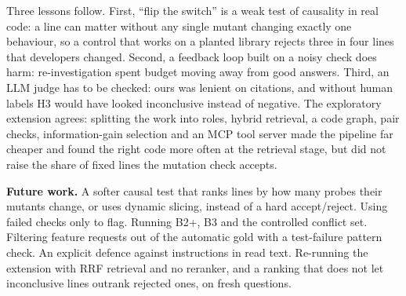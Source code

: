 \documentclass[10pt,a4paper]{article}
\begin{document}
Three lessons follow. First, ``flip the switch'' is a weak test of causality in real code: a line can matter without
any single mutant changing exactly one behaviour, so a control that works on a planted library rejects three in four
lines that developers changed. Second, a feedback loop built on a noisy check does harm: re-investigation spent budget
moving away from good answers. Third, an LLM judge has to be checked: ours was lenient on citations, and without human
labels H3 would have looked inconclusive instead of negative. The exploratory extension agrees: splitting the work
into roles, hybrid retrieval, a code graph, pair checks, information-gain selection and an MCP tool server made the
pipeline far cheaper and found the right code more often at the retrieval stage, but did not raise the share of fixed
lines the mutation check accepts.

\textbf{Future work.} A softer causal test that ranks lines by how many probes their mutants change, or uses dynamic
slicing, instead of a hard accept/reject. Using failed checks only to flag. Running B2+, B3 and the controlled conflict
set. Filtering feature requests out of the automatic gold with a test-failure pattern check. An explicit defence
against instructions in read text. Re-running the extension with RRF retrieval and no reranker, and a ranking that does
not let inconclusive lines outrank rejected ones, on fresh questions.
\end{document}
